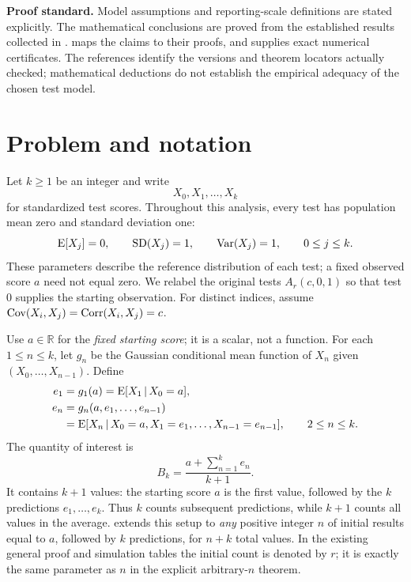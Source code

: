\noindent\textbf{Proof standard.} Model assumptions and reporting-scale
definitions are stated explicitly. The mathematical conclusions are proved
from the established results collected in .
 maps the claims to their proofs, and
 supplies exact numerical certificates.
The references identify the versions and theorem locators actually checked;
mathematical deductions do not establish the empirical adequacy of the chosen
test model.

\tableofcontents
\mainmatter

\chapter{Problem and notation}

Let \(k\geq1\) be an integer and write
\[
  X_0,X_1,\ldots,X_k
\]
for standardized test scores. Throughout this analysis, every test has
population mean zero and standard deviation one:
\begin{equation}
  \operatorname{E}[X_j]=0,\qquad \operatorname{SD}(X_j)=1,
  \qquad \operatorname{Var}(X_j)=1,\qquad 0\leq j\leq k.
  \label{eq:standardization}
\end{equation}
These parameters describe the reference distribution of each test; a fixed
observed score \(a\) need not equal zero. We
relabel the original tests \(A_r(c,0,1)\) so that test \(0\) supplies the
starting observation. For distinct indices,
assume \(\operatorname{Cov}(X_i,X_j)=\operatorname{Corr}(X_i,X_j)=c\).

Use \(a\in\mathbb{R}\) for the \emph{fixed starting score}; it is a scalar,
not a function. For each \(1\leq n\leq k\), let \(g_n\) be the Gaussian conditional
mean function of \(X_n\) given \((X_0,\ldots,X_{n-1})\). Define
\begin{align}
  e_1&=g_1(a)=\operatorname{E}[X_1\,\vert\, X_0=a],\label{eq:first}\\
  e_n&=g_n(a,e_1,\ldots,e_{n-1})\notag\\
     &=\operatorname{E}[X_n\,\vert\, X_0=a,X_1=e_1,\ldots,X_{n-1}=e_{n-1}],
       \qquad 2\leq n\leq k.\label{eq:definition}
\end{align}
The quantity of interest is
\begin{equation}
  \boxed{B_k=\frac{a+\sum_{n=1}^{k}e_n}{k+1}.}
  \label{eq:target}
\end{equation}
It contains \(k+1\) values: the starting score \(a\) is the first value,
followed by the \(k\) predictions \(e_1,\ldots,e_k\). Thus \(k\) counts
subsequent predictions, while \(k+1\) counts all values in the average.
 extends this setup to \emph{any} positive
integer \(n\) of initial results equal to \(a\), followed by \(k\)
predictions, for \(n+k\) total values. In the existing general proof and
simulation tables the initial count is denoted by \(r\); it is exactly
the same parameter as \(n\) in the explicit arbitrary-\(n\) theorem.

